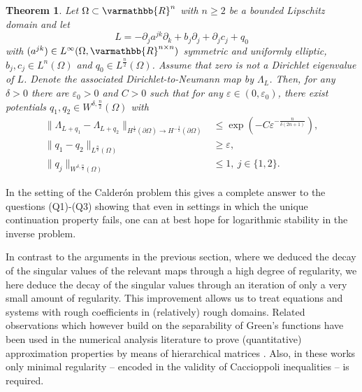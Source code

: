 \documentclass[12pt,twoside]{amsart}
\numberwithin{equation}{section}
\renewcommand{\leq}{\leqslant}
\renewcommand{\geq}{\geqslant}
\renewcommand{\mathbb}{\varmathbb}
\newtheorem{theorem}{Theorem}[section]
\newcommand {\R} {\mathbb{R}} \newcommand {\Z} {\mathbb{Z}}
\newcommand {\p} {\partial}
\newcommand{\eps}{\varepsilon}
\begin{document}
\begin{theorem}
\label{thm:thm_Calderon}
Let $\Omega \subset \R^n$ with $n\geq 2$ be a bounded Lipschitz domain and let 
\[
L = - \p_j a^{jk} \p_k + b_j \p_j + \p_j c_j + q_0
\]
with $(a^{jk}) \in L^{\infty}(\Omega, \R^{n\times n})$ symmetric and uniformly elliptic, $b_j, c_j \in L^{n}(\Omega)$ and $q_0 \in L^{\frac{n}{2}}(\Omega)$. Assume that zero is not a Dirichlet eigenvalue of $L$. Denote the associated Dirichlet-to-Neumann map by $\Lambda_{L}$. 
Then, for any $\delta>0$ there are $\eps_0 >0$ and $C>0$ such that for any $\eps \in (0,\eps_0)$, there exist potentials $q_1, q_2 \in  W^{\delta,\frac{n}{2}}(\Omega)$ with 
\begin{align*}
\|\Lambda_{L + q_1}- \Lambda_{L + q_2}\|_{H^{\frac{1}{2}}(\partial \Omega) \rightarrow H^{-\frac{1}{2}}(\partial \Omega)} 
&\leq  \exp(-C\eps^{-\frac{n}{\delta(2n+1)}}),\\
\|q_1 -q_2\|_{L^{\frac{n}{2}}(\Omega)}&\geq \eps,\\
\|q_j \|_{W^{\delta,\frac{n}{2}}(\Omega)} & \leq 1, \ j \in \{1,2\}.
\end{align*}
\end{theorem}

In the setting of the Calder\'on problem this gives a complete answer to the questions (Q1)-(Q3) showing that even in settings in which the unique continuation property fails, one can at best hope for logarithmic stability in the inverse problem. 

In contrast to the arguments in the previous section, where we deduced the decay of the singular values of the relevant maps through a high degree of regularity, we here deduce the decay of the singular values through an iteration of only a very small amount of regularity. This improvement allows us to treat equations and systems with rough coefficients in (relatively) rough domains. Related observations which however build on the separability of Green's functions have been used in the numerical analysis literature to prove (quantitative) approximation properties by means of hierarchical matrices \cite{BH03, EZ18}. Also, in these works only minimal regularity -- encoded in the validity of Caccioppoli inequalities -- is required.
\end{document}
